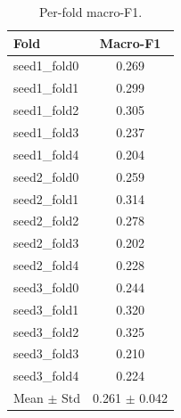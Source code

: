 \begin{table}[t]
\centering
\begin{tabular}{lc}
\toprule
Fold & Macro-F1 \\
\midrule
seed1\_fold0 & 0.269 \\
seed1\_fold1 & 0.299 \\
seed1\_fold2 & 0.305 \\
seed1\_fold3 & 0.237 \\
seed1\_fold4 & 0.204 \\
seed2\_fold0 & 0.259 \\
seed2\_fold1 & 0.314 \\
seed2\_fold2 & 0.278 \\
seed2\_fold3 & 0.202 \\
seed2\_fold4 & 0.228 \\
seed3\_fold0 & 0.244 \\
seed3\_fold1 & 0.320 \\
seed3\_fold2 & 0.325 \\
seed3\_fold3 & 0.210 \\
seed3\_fold4 & 0.224 \\
\midrule
Mean $\pm$ Std & 0.261 $\pm$ 0.042 \\
\bottomrule
\end{tabular}
\caption{Per-fold macro-F1.}
\label{tab:folds}
\end{table}